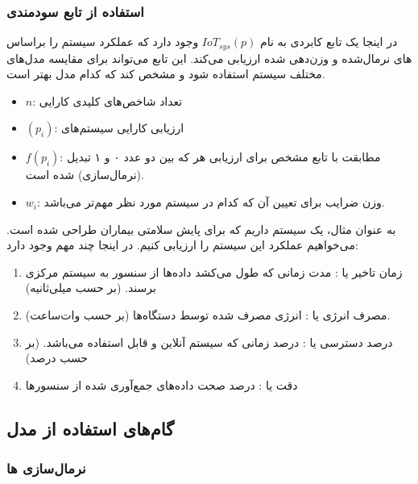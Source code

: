 \subsubsection{استفاده از تابع سودمندی }

در اینجا یک تابع کابردی به نام $IoT_{sys}(p)$ وجود دارد که عملکرد سیستم 
را براساس های نرمال‌شده و وزن‌دهی شده ارزیابی می‌کند. این تابع می‌تواند
برای مقایسه مدل‌های مختلف سیستم  استفاده شود و مشخص کند که کدام مدل بهتر
است.

\label{compareIoTSystems}

\begin{itemize}
    \item $n$: تعداد شاخص‌های کلیدی کارایی
    \item $(p_i)$: ارزیابی کارایی سیستم‌های 
    \item $f(p_i)$: مطابقت با تابع  مشخص برای ارزیابی هر  که
    بین دو عدد ۰ و ۱ تبدیل (نرمال‌سازی) شده است.
    \item $w_i$: وزن ضرایب برای تعیین آن که کدام  در سیستم  مورد
    نظر مهم‌تر می‌باشد.
\end{itemize}

به عنوان مثال، یک سیستم  داریم که برای پایش سلامتی بیماران طراحی شده
است. می‌خواهیم عملکرد این سیستم را ارزیابی کنیم. در اینجا چند  مهم وجود
دارد:

\begin{enumerate}
    \item زمان تاخیر یا : مدت زمانی که طول می‌کشد داده‌ها از سنسور
    به سیستم مرکزی برسند. (بر حسب میلی‌ثانیه)
    \item مصرف انرژی یا : انرژی مصرف شده توسط دستگاه‌ها
    (بر حسب وات‌ساعت).
    \item درصد دسترسی یا : درصد زمانی که سیستم آنلاین و قابل
    استفاده می‌باشد. (بر حسب درصد)
    \item دقت یا : درصد صحت داده‌های جمع‌آوری شده از سنسور‌ها
\end{enumerate}

\subsection*{گام‌های استفاده از مدل}

\subsubsection*{نرمال‌سازی ها}

